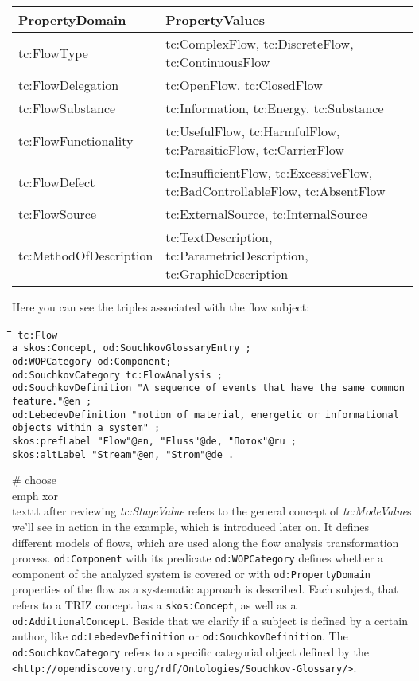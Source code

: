 \documentclass[a4paper,11pt]{article}
\newenvironment{code}{\tt \begin{tabbing}
\hskip12pt\=\hskip12pt\=\hskip12pt\=\hskip12pt\=\hskip5cm\=\hskip5cm\=\kill}
{\end{tabbing}}
\begin{document}
    \begin{center}
    \begin{tabular}{|l|p{10cm}|}\hline
        PropertyDomain & PropertyValues \\\hline
        tc:FlowType & tc:ComplexFlow, tc:DiscreteFlow, tc:ContinuousFlow \\
        tc:FlowDelegation & tc:OpenFlow, tc:ClosedFlow \\
        tc:FlowSubstance & tc:Information, tc:Energy, tc:Substance \\
        tc:FlowFunctionality & tc:UsefulFlow, tc:HarmfulFlow, tc:ParasiticFlow,
        tc:CarrierFlow  \\
        tc:FlowDefect & tc:InsufficientFlow, tc:ExcessiveFlow,
        tc:BadControllableFlow, tc:AbsentFlow \\ 
        tc:FlowSource & tc:ExternalSource, tc:InternalSource  \\
        tc:MethodOfDescription & tc:TextDescription, tc:ParametricDescription,
        tc:GraphicDescription \\\hline 
    \end{tabular}
    \end{center}

    Here you can see the triples associated with the flow subject:
    \begin{code}\tt
    tc:Flow \\
    \> a skos:Concept, od:SouchkovGlossaryEntry ; \\
    \> od:WOPCategory od:Component; \\
    \> od:SouchkovCategory tc:FlowAnalysis ; \\
    \> od:SouchkovDefinition "A sequence of events that have the same common 
    feature."@en ; \\
    \> od:LebedevDefinition "motion of material, energetic or informational 
    objects within a system" ; \\
    \> skos:prefLabel "Flow"@en, "Fluss"@de, "Поток"@ru ; \\
    \> skos:altLabel "Stream"@en, "Strom"@de . \\
    \end{code}

    # choose \\emph xor \\texttt after reviewing 
    \emph{tc:StageValue} refers to the general concept of \emph{tc:ModeValue}s 
    we'll see in action in the example, which is introduced later on. It defines
    different models of flows, which are used along the flow analysis 
    transformation process. \texttt{od:Component} with its predicate
    \texttt{od:WOPCategory} defines whether a component of the analyzed system
    is covered or with \texttt{od:PropertyDomain} properties of the flow as a
    systematic approach is described. Each subject, that refers to a TRIZ 
    concept has a \texttt{skos:Concept}, as well as a 
    \texttt{od:AdditionalConcept}. Beside that we clarify if a subject is defined
    by a certain author, like \texttt{od:LebedevDefinition} or 
    \texttt{od:SouchkovDefinition}. The \texttt{od:SouchkovCategory} refers to a
    specific categorial object defined by the
    \texttt{<http://opendiscovery.org/rdf/Ontologies/Souchkov-Glossary/>}.
\end{document}
